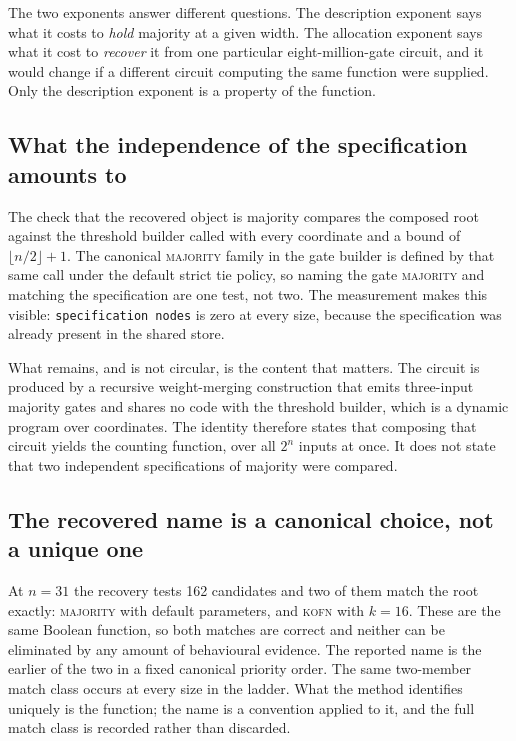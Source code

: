 \documentclass[11pt,a4paper]{article}
\begin{document}
The two exponents answer different questions. The description exponent says
what it costs to \emph{hold} majority at a given width. The allocation exponent
says what it cost to \emph{recover} it from one particular eight-million-gate
circuit, and it would change if a different circuit computing the same function
were supplied. Only the description exponent is a property of the function.

\subsection{What the independence of the specification amounts to}

The check that the recovered object is majority compares the composed root
against the threshold builder called with every coordinate and a bound of
$\lfloor n/2\rfloor+1$. The canonical \textsc{majority} family in the gate
builder is defined by that same call under the default strict tie policy, so
naming the gate \textsc{majority} and matching the specification are one test,
not two. The measurement makes this visible:
\texttt{specification nodes} is zero at every size, because the specification
was already present in the shared store.

What remains, and is not circular, is the content that matters. The circuit is
produced by a recursive weight-merging construction that emits three-input
majority gates and shares no code with the threshold builder, which is a
dynamic program over coordinates. The identity therefore states that composing
that circuit yields the counting function, over all $2^n$ inputs at once. It
does not state that two independent specifications of majority were compared.

\subsection{The recovered name is a canonical choice, not a unique one}

At $n=31$ the recovery tests 162 candidates and two of them match the root
exactly: \textsc{majority} with default parameters, and \textsc{kofn} with
$k=16$. These are the same Boolean function, so both matches are correct and
neither can be eliminated by any amount of behavioural evidence. The reported
name is the earlier of the two in a fixed canonical priority order. The same
two-member match class occurs at every size in the ladder. What the method
identifies uniquely is the function; the name is a convention applied to it,
and the full match class is recorded rather than discarded.
\end{document}
